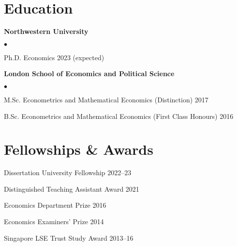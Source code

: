 \documentclass[margin,line]{res}
\newenvironment{list1}{
  \begin{list}{\ding{113}}{%
      \setlength{\itemsep}{.025in}
      \setlength{\parsep}{0in} \setlength{\parskip}{0in}
      \setlength{\topsep}{0in} \setlength{\partopsep}{0in}
      \setlength{\leftmargin}{0.17in}}}{\end{list}}
\newenvironment{list2}{
  \begin{list}{$\bullet$}{%
      \setlength{\itemsep}{0in}
      \setlength{\parsep}{0in} \setlength{\parskip}{0in}
      \setlength{\topsep}{0in} \setlength{\partopsep}{0in}
      \setlength{\leftmargin}{0.2in}}}{\end{list}}
\begin{document}
\begin{resume}
\section{Education}
\begin{list1}
\item[] \textbf{Northwestern University} 
\begin{list2}
		\item[] Ph.D. Economics \hfill 2023 (expected) \\[-2ex]
\end{list2} 
\item[] \textbf{London School of Economics and Political Science}
\begin{list2}
		\item[] M.Sc. Econometrics and Mathematical Economics (Distinction) \hfill 2017 
		\item[] B.Sc. Econometrics and Mathematical Economics (First Class Honours) \hfill 2016
\end{list2}
\end{list1}
\vspace*{.05in}

\section{Fellowships \& Awards}
\begin{list1}
\item[] Dissertation University Fellowship \hfill 2022--23
\item[] Distinguished Teaching Assistant Award \hfill 2021
\item[] Economics Department Prize  \hfill 2016
\item[] Economics Examiners' Prize  \hfill 2014
\item[] Singapore LSE Trust Study Award \hfill 2013--16
\end{list1}
\vspace*{.05in}


\end{resume}
\end{document}
